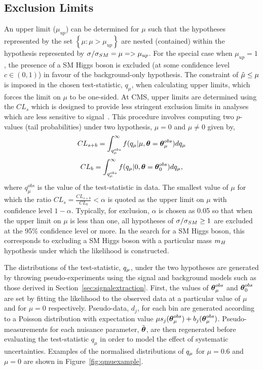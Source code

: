 \subsection{Exclusion Limits}
An upper limit ($\mu_{up}$) can be determined for $\mu$ such that
the hypotheses represented by the set $\left\{ \mu:\mu>\mu_{up} \right\}$
are nested (contained) within the hypothesis represented by $\sigma/\sigma_{SM}=\mu=>\mu_{up}$.
For the special case when $\mu_{up}=1$, the presence of a SM Higgs boson is excluded
(at some confidence level $c\in(0,1)$) in favour of the background-only hypothesis. 
The constraint of $\hat{\mu} \le \mu$ is imposed in the chosen test-statistic, $q_{\mu}$,  
when calculating upper limits, which forces the limit on $\mu$ to be one-sided.
At CMS, upper limits are determined using the $CL_{s}$
which is designed to provide less stringent exclusion limits in analyses 
which are less sensitive to signal~\citep{cls}. 
This procedure involves computing two $p$-values (tail probabilities) under two hypothesis, $\mu=0$ and $\mu\ne0$ given by,
\begin{equation}
	CL_{s+b} = \int_{q_{\mu}^{obs}}^{\infty} f(q_{\mu} | \mu,{\boldsymbol{\theta}}={\boldsymbol{\theta}}_{\mu}^{obs}) dq_{\mu}
\label{eqn:clsplusb}
\end{equation}
\begin{equation}
	CL_{b} = \int_{q_{\mu}^{obs}}^{\infty} f(q_{\mu} |0,{\boldsymbol{\theta}}={\boldsymbol{\theta}}_{0}^{obs}) dq_{\mu},
\label{eqn:clb}
\end{equation}
where $q_{\mu}^{obs}$ is the value of the test-statistic in data. 
The smallest value of $\mu$ for which the ratio $CL_{s}=\frac{\displaystyle CL_{s+b}}{\displaystyle CL_{b}}<\alpha$ is quoted as the upper limit on $\mu$ with confidence level 
$1-\alpha$. Typically, for exclusion, $\alpha$ is chosen as 0.05 so that 
when the upper limit on $\mu$ is less than one, all hypotheses of $\sigma/\sigma_{SM}\ge1$ are excluded 
at the 95\% confidence level or more. In the search for a SM Higgs boson, this corresponds to excluding 
a SM Higgs boson with a particular mass $m_{H}$ hypothesis under which the likelihood is constructed.
 
The distributions of the test-statistic, $q_{\mu}$, under the two hypotheses are generated by 
throwing pseudo-experiments using the signal and background models such as those 
derived in Section~\ref{sec:signalextraction}.
First, the values of ${\boldsymbol{\theta}}^{obs}_{\mu}$ and ${\boldsymbol{\theta}}^{obs}_{0}$ are set by fitting the likelihood 
to the observed data at a particular value of $\mu$ and for $\mu=0$ respectively. Pseudo-data, $d_{j}$, for each bin
are generated according to a Poisson distribution with expectation value 
$\mu s_{j}({\boldsymbol{\theta}}_{\mu}^{obs})+b_{j}({\boldsymbol{\theta}}_{\mu}^{obs})$. Pseudo-measurements for each nuisance parameter,
$\tilde{{\boldsymbol{\theta}}}$, are then regenerated before evaluating the
test-statistic $q_{\mu}$ in order to model the effect of systematic uncertainties. 
Examples of the normalised distributions of $q_{\mu}$ for $\mu=0.6$ and $\mu=0$ are shown in 
Figure~\ref{fig:qmuexample}.

